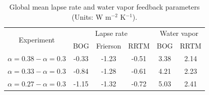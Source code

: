 
\begin{table}[ht]
	\centering
	\small
	\caption{Global mean lapse rate and water vapor feedback parameters (Units: W m$^{-2}$ K$^{-1}$).}
	\vspace{0.5em}
	\label{tab:lapserate_and_wv_fb}
	\begin{tabular}{cccccc}
		\toprule
		\multirow{2}{*}{Experiment} & \multicolumn{3}{c}{Lapse rate} & \multicolumn{2}{c}{Water vapor} \\
		\cline{2-4}\cline{5-6}
		{} & BOG & Frierson & RRTM & BOG & RRTM\\
		\midrule
		$\alpha=0.38 -\alpha=0.3$ & -0.33 & -1.23 & -0.51 & 3.38 & 2.14 \\
		$\alpha=0.33 - \alpha=0.3$ & -0.84 & -1.28 & -0.61 & 4.21 & 2.23 \\
		$\alpha=0.27-\alpha=0.3$ & -1.15 & -1.32 & -0.72 & 5.03 & 2.41 \\
		\bottomrule
	\end{tabular}
\end{table}


